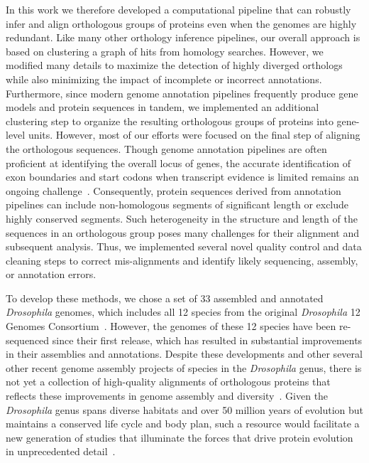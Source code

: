 In this work we therefore developed a computational pipeline that can robustly infer and align orthologous groups of proteins even when the genomes are highly redundant. Like many other orthology inference pipelines, our overall approach is based on clustering a graph of hits from homology searches. However, we modified many details to maximize the detection of highly diverged orthologs while also minimizing the impact of incomplete or incorrect annotations. Furthermore, since modern genome annotation pipelines frequently produce gene models and protein sequences in tandem, we implemented an additional clustering step to organize the resulting orthologous groups of proteins into gene-level units. However, most of our efforts were focused on the final step of aligning the orthologous sequences. Though genome annotation pipelines are often proficient at identifying the overall locus of genes, the accurate identification of exon boundaries and start codons when transcript evidence is limited remains an ongoing challenge~\cite{Frankish2015, Dunne2018}. Consequently, protein sequences derived from annotation pipelines can include non-homologous segments of significant length or exclude highly conserved segments. Such heterogeneity in the structure and length of the sequences in an orthologous group poses many challenges for their alignment and subsequent analysis. Thus, we implemented several novel quality control and data cleaning steps to correct mis-alignments and identify likely sequencing, assembly, or annotation errors.

To develop these methods, we chose a set of 33 assembled and annotated \textit{Drosophila} genomes, which includes all 12 species from the original \textit{Drosophila} 12 Genomes Consortium~\cite{D12GC2007}. However, the genomes of these 12 species have been re-sequenced since their first release, which has resulted in substantial improvements in their assemblies and annotations. Despite these developments and other several other recent genome assembly projects of species in the \textit{Drosophila} genus, there is not yet a collection of high-quality alignments of orthologous proteins that reflects these improvements in genome assembly and diversity~\cite{Miller2018, Kim2021}. Given the \textit{Drosophila} genus spans diverse habitats and over 50 million years of evolution but maintains a conserved life cycle and body plan, such a resource would facilitate a new generation of studies that illuminate the forces that drive protein evolution in unprecedented detail~\cite{Wiegmann2011, Obbard2012}.

